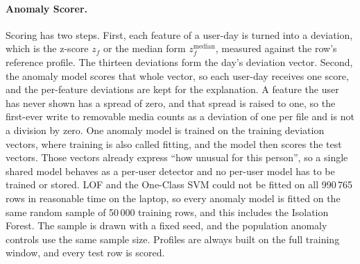\documentclass[a4paper,12pt]{article}
\begin{document}
\paragraph{Anomaly Scorer.} Scoring has two steps. First, each feature of a user-day is turned into a deviation, which is the z-score $z_f$ or the median form $z^{\text{median}}_f$, measured against the row's reference profile. The thirteen deviations form the day's deviation vector. Second, the anomaly model scores that whole vector, so each user-day receives one score, and the per-feature deviations are kept for the explanation. A feature the user has never shown has a spread of zero, and that spread is raised to one, so the first-ever write to removable media counts as a deviation of one per file and is not a division by zero. One anomaly model is trained on the training deviation vectors, where training is also called fitting, and the model then scores the test vectors. Those vectors already express ``how unusual for this person'', so a single shared model behaves as a per-user detector and no per-user model has to be trained or stored. LOF and the One-Class SVM could not be fitted on all 990\,765 rows in reasonable time on the laptop, so every anomaly model is fitted on the same random sample of 50\,000 training rows, and this includes the Isolation Forest. The sample is drawn with a fixed seed, and the population anomaly controls use the same sample size. Profiles are always built on the full training window, and every test row is scored.
\end{document}
